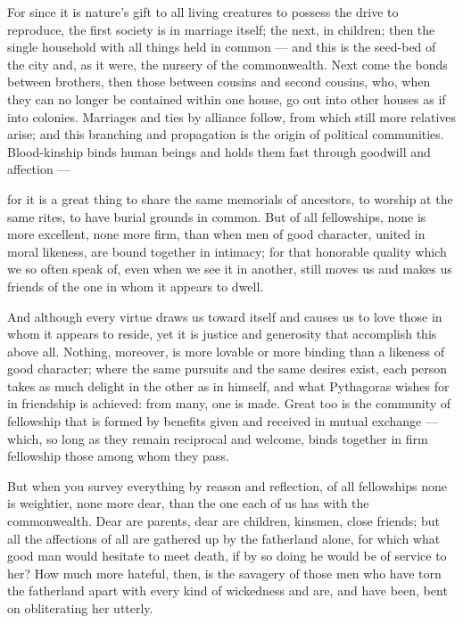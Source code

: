  For since it is nature's gift to all living creatures to possess the drive to reproduce, the first society is in marriage itself; the next, in children; then the single household with all things held in common — and this is the seed-bed of the city and, as it were, the nursery of the commonwealth. Next come the bonds between brothers, then those between cousins and second cousins, who, when they can no longer be contained within one house, go out into other houses as if into colonies. Marriages and ties by alliance follow, from which still more relatives arise; and this branching and propagation is the origin of political communities. Blood-kinship binds human beings and holds them fast through goodwill and affection —

 for it is a great thing to share the same memorials of ancestors, to worship at the same rites, to have burial grounds in common. But of all fellowships, none is more excellent, none more firm, than when men of good character, united in moral likeness, are bound together in intimacy; for that honorable quality which we so often speak of, even when we see it in another, still moves us and makes us friends of the one in whom it appears to dwell.

 And although every virtue draws us toward itself and causes us to love those in whom it appears to reside, yet it is justice and generosity that accomplish this above all. Nothing, moreover, is more lovable or more binding than a likeness of good character; where the same pursuits and the same desires exist, each person takes as much delight in the other as in himself, and what Pythagoras wishes for in friendship is achieved: from many, one is made. Great too is the community of fellowship that is formed by benefits given and received in mutual exchange — which, so long as they remain reciprocal and welcome, binds together in firm fellowship those among whom they pass.

 But when you survey everything by reason and reflection, of all fellowships none is weightier, none more dear, than the one each of us has with the commonwealth. Dear are parents, dear are children, kinsmen, close friends; but all the affections of all are gathered up by the fatherland alone, for which what good man would hesitate to meet death, if by so doing he would be of service to her? How much more hateful, then, is the savagery of those men who have torn the fatherland apart with every kind of wickedness and are, and have been, bent on obliterating her utterly.

